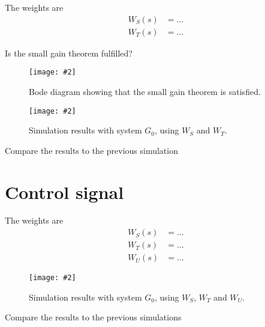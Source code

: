 \documentclass[11pt,a4paper]{article}
\newcommand{\image}[3]{
	\begin{figure}[!ht]
		\centering
	    \texttt{[image: \#2]}
		\caption{#3}
		\label{fig:#2}
	\end{figure}
}
\begin{document}
\par The weights are
	\begin{align*}
		W_S(s) &= \ldots\\
		W_T(s) &= \ldots
	\end{align*}

\par Is the small gain theorem fulfilled?
\par\dotfill\par\dotfill\par

	\image{0.8}{41}{Bode diagram showing that the small gain theorem is satisfied.}
	\image{0.8}{41}{Simulation results with system $G_0$, using $W_S$ and $W_T$.}

\par Compare the results to the previous simulation
\par\dotfill\par\dotfill\par


\section*{Control signal}
\par The weights are
	\begin{align*}
		W_S(s) &= \ldots\\
		W_T(s) &= \ldots\\
		W_U(s) &= \ldots
	\end{align*}

	\image{0.8}{41}{Simulation results with system $G_0$, using $W_S$, $W_T$ and $W_U$.}

\par Compare the results to the previous simulations
\par\dotfill\par\dotfill\par
\end{document}
